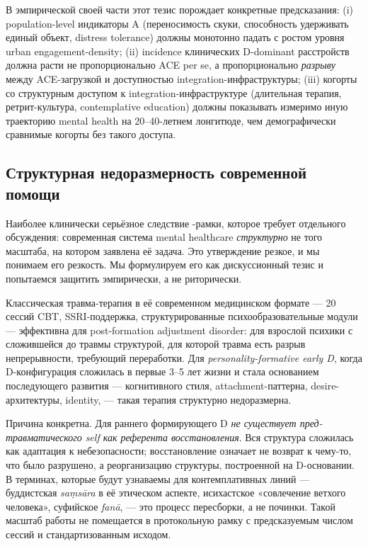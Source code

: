 В эмпирической своей части этот тезис порождает конкретные предсказания: (i) population-level индикаторы A (переносимость скуки, способность удерживать единый объект, distress tolerance) должны монотонно падать с ростом уровня urban engagement-density; (ii) incidence клинических D-dominant расстройств должна расти не пропорционально ACE per se, а пропорционально \emph{разрыву} между ACE-загрузкой и доступностью integration-инфраструктуры; (iii) когорты со структурным доступом к integration-инфраструктуре (длительная терапия, ретрит-культура, contemplative education) должны показывать измеримо иную траекторию mental health на 20--40-летнем лонгитюде, чем демографически сравнимые когорты без такого доступа.

\subsection{Структурная недоразмерность современной помощи}
\label{subsec:undersizing}

Наиболее клинически серьёзное следствие \DEIC{}-рамки, которое требует отдельного обсуждения: современная система mental healthcare \emph{структурно} не того масштаба, на котором заявлена её задача. Это утверждение резкое, и мы понимаем его резкость. Мы формулируем его как дискуссионный тезис и попытаемся защитить эмпирически, а не риторически.

Классическая травма-терапия в её современном медицинском формате --- 20 сессий CBT, SSRI-поддержка, структурированные психообразовательные модули --- эффективна для post-formation adjustment disorder: для взрослой психики с сложившейся до травмы структурой, для которой травма есть разрыв непрерывности, требующий переработки. Для \emph{personality-formative early D}, когда D-конфигурация сложилась в первые 3--5 лет жизни и стала основанием последующего развития --- когнитивного стиля, attachment-паттерна, desire-архитектуры, identity, --- такая терапия структурно недоразмерна.

Причина конкретна. Для раннего формирующего D \emph{не существует пред-травматического self как референта восстановления}. Вся структура сложилась как адаптация к небезопасности; восстановление означает не возврат к чему-то, что было разрушено, а реорганизацию структуры, построенной на D-основании. В терминах, которые будут узнаваемы для контемплативных линий --- буддистская \textit{saṃsāra} в её этическом аспекте, исихастское «совлечение ветхого человека», суфийское \textit{fanā}, --- это процесс пересборки, а не починки. Такой масштаб работы не помещается в протокольную рамку с предсказуемым числом сессий и стандартизованным исходом.

